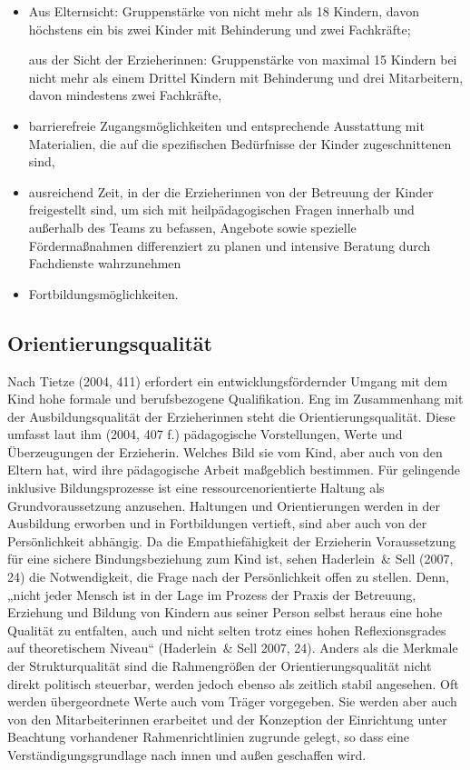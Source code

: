 \begin{itemize}
\item Aus Elternsicht: Gruppenstärke von nicht mehr als 18 Kindern, davon höchstens ein bis zwei Kinder mit Behinderung und zwei Fachkräfte; 

aus der Sicht der Erzieherinnen: Gruppenstärke von maximal 15 Kindern bei nicht mehr als einem Drittel Kindern mit Behinderung und drei Mitarbeitern, davon mindestens zwei Fachkräfte,
\item barrierefreie Zugangsmöglichkeiten und entsprechende Ausstattung mit Materialien, die auf die spezifischen Bedürfnisse der Kinder zugeschnittenen sind, 
\item ausreichend Zeit, in der die Erzieherinnen von der Betreuung der Kinder freigestellt sind, um sich mit heilpädagogischen Fragen innerhalb und außerhalb des Teams zu befassen, Angebote sowie spezielle Fördermaßnahmen differenziert zu planen und intensive Beratung durch Fachdienste wahrzunehmen
\item Fortbildungsmöglichkeiten.
\end{itemize}

\subsection{Orientierungsqualität}
Nach Tietze (2004, 411) erfordert ein entwicklungsfördernder Umgang mit dem Kind hohe formale und berufsbezogene Qualifikation. Eng im Zusammenhang mit der Ausbildungsqualität der Erzieherinnen steht die Orientierungsqualität. Diese umfasst laut ihm (2004, 407 f.) pädagogische Vorstellungen, Werte und Überzeugungen der Erzieherin. Welches Bild sie vom Kind, aber auch von den Eltern hat, wird ihre pädagogische Arbeit maßgeblich bestimmen. Für gelingende inklusive Bildungsprozesse ist eine ressourcenorientierte Haltung als Grundvoraussetzung anzusehen. Haltungen und Orientierungen werden in der Ausbildung erworben und in Fortbildungen vertieft, sind aber auch von der Persönlichkeit abhängig. 
Da die Empathiefähigkeit der Erzieherin Voraussetzung für eine sichere Bindungsbeziehung zum Kind ist, sehen Haderlein~\& Sell (2007, 24) die Notwendigkeit, die Frage nach der Persönlichkeit offen zu stellen. Denn, „nicht jeder Mensch ist in der Lage im Prozess der Praxis der Betreuung, Erziehung und Bildung von Kindern aus seiner Person selbst heraus eine hohe Qualität zu entfalten, auch und nicht selten trotz eines hohen Reflexionsgrades auf theoretischem Niveau“ (Haderlein~\& Sell 2007, 24). Anders als die Merkmale der Strukturqualität sind die Rahmengrößen der Orientierungsqualität nicht direkt politisch steuerbar, werden jedoch ebenso als zeitlich stabil angesehen. Oft werden übergeordnete Werte auch vom Träger vorgegeben. Sie werden aber auch von den Mitarbeiterinnen erarbeitet und der Konzeption der Einrichtung unter Beachtung vorhandener Rahmenrichtlinien zugrunde gelegt, so dass eine Verständigungsgrundlage nach innen und außen geschaffen wird. 

